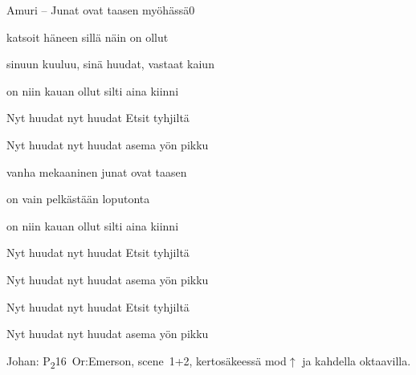 \documentclass[12pt,a4paper]{article}
\begin{document}
\thispagestyle{empty}
\begin{mysong}{Amuri – Junat ovat taasen myöhässä}{0}


\begin{SBVerse}
   katsoit häneen sillä   näin on
  ollut 

   sinuun kuuluu, sinä   huudat, vastaat
  kaiun 

   on niin kauan ollut   silti aina
  kiinni 
\end{SBVerse}

\begin{SBChorus}
  Nyt huudat  nyt huudat  Etsit
   tyhjiltä 

  Nyt huudat  nyt huudat 
  asema yön pikku
\end{SBChorus}


\begin{SBVerse}
   vanha mekaaninen   junat ovat
  taasen 

   on vain pelkästään   loputonta

   on niin kauan ollut   silti aina
  kiinni 
\end{SBVerse}

\begin{SBChorus}
  Nyt huudat  nyt huudat  Etsit
   tyhjiltä 

  Nyt huudat  nyt huudat 
  asema yön pikku
\end{SBChorus}


\begin{SBChorus}
  Nyt huudat  nyt huudat  Etsit
   tyhjiltä 

  Nyt huudat  nyt huudat 
  asema yön pikku
\end{SBChorus}

{\SBLyricNoteFont Johan: P\textsubscript{2}16~Or:Emerson, scene~1+2,
kertosäkeessä mod$\uparrow$ ja kahdella oktaavilla.}

\end{mysong}
\end{document}
